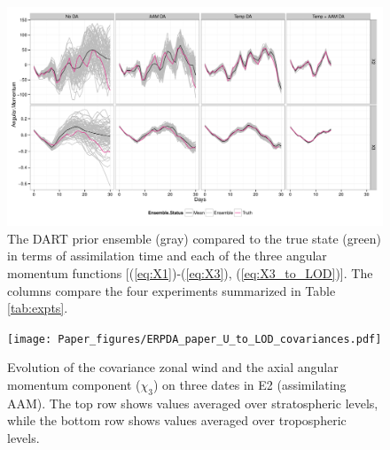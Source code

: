 \begin{figure}[p]
\includegraphics[width=\textwidth]{Paper_figures/ERPDA_paper_erpda_obs_space.pdf} 
 \caption{ The DART prior ensemble (gray) compared to the true state (green) in terms of assimilation time and each of the three angular momentum functions [(\ref{eq:X1})-(\ref{eq:X3}), (\ref{eq:X3_to_LOD})].  The columns compare the four experiments summarized in Table \ref{tab:expts}.  }
 \label{fig:fit_to_ERPs}
\end{figure}

 \begin{figure}
	 \texttt{[image: Paper\_figures/ERPDA\_paper\_U\_to\_LOD\_covariances.pdf]}
	 \caption{Evolution of the covariance zonal wind and the axial angular momentum component ($\chi_3$) on three dates in E2 (assimilating AAM). The top row shows values averaged over stratospheric levels, while the bottom row shows values averaged over tropospheric levels.}
 \label{fig:covariances}
\end{figure}

